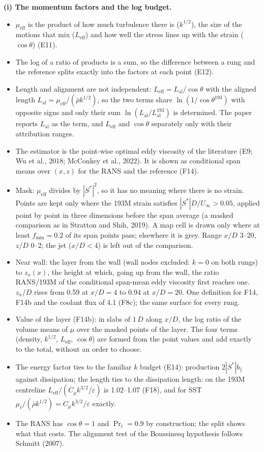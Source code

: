 \documentclass[10pt]{article}
\begin{document}
\textbf{(i) The momentum factors and the log budget.}
\begin{itemize}
\item $\mu_{\mathrm{eff}}$ is the product of how much turbulence there is ($k^{1/2}$), the size of the motions
  that mix ($L_{\mathrm{eff}}$) and how well the stress lines up with the strain ($\cos\theta$) (E11).
\item The log of a ratio of products is a sum, so the difference between a rung and the reference splits
  exactly into the factors at each point (E12).
\item Length and alignment are not independent: $L_{\mathrm{eff}}=L_{\mathrm{al}}/\cos\theta$ with the aligned length
  $L_{\mathrm{al}}=\mu_{\mathrm{eff}}/(\bar\rho k^{1/2})$, so the two terms share $\ln(1/\cos\theta^{193})$ with opposite
  signs and only their sum $\ln(L_{\mathrm{al}}/L_{\mathrm{al}}^{193})$ is determined. The paper reports $L_{\mathrm{al}}$
  as the term, and $L_{\mathrm{eff}}$ and $\cos\theta$ separately only with their attribution ranges.
\item The estimator is the point-wise optimal eddy viscosity of the literature (E9; Wu et al., 2018; McConkey et
  al., 2022). It is shown as conditional span means over $(x,z)$ for the RANS and the reference (F14).
\item Mask: $\mu_{\mathrm{eff}}$ divides by $|S^*|^2$, so it has no meaning where there is no strain. Points are
  kept only where the 193M strain satisfies $|S^*|D/U_\infty>0.05$, applied point by point in three dimensions
  before the span average (a masked comparison as in Stratton and Shih, 2019). A map cell is drawn only where at
  least $f_{\min}=0.2$ of its span points pass; elsewhere it is grey. Range $x/D$ 3--20, $z/D$ 0--2; the jet
  ($x/D<4$) is left out of the comparison.
\item Near wall: the layer from the wall (wall nodes excluded: $k=0$ on both rungs) to $z_x(x)$, the height at
  which, going up from the wall, the ratio RANS/193M of the conditional span-mean eddy viscosity first reaches
  one. $z_x/D$ rises from 0.59 at $x/D=4$ to 0.94 at $x/D=20$. One definition for F14, F14b and the coolant flux
  of 4.1 (F8c); the same surface for every rung.
\item Value of the layer (F14b): in slabs of $1\,D$ along $x/D$, the log ratio of the volume means of $\mu$ over the
  masked points of the layer. The four terms (density, $k^{1/2}$, $L_{\mathrm{eff}}$, $\cos\theta$) are formed
  from the point values and add exactly to the total, without an order to choose.
\item The energy factor ties to the familiar $k$ budget (E14): production $2|S^*|b_\parallel$ against
  dissipation; the length ties to the dissipation length: on the 193M centreline $L_{\mathrm{eff}}/(C_\mu
  k^{3/2}/\varepsilon)$ is 1.02--1.07 (F18), and for SST $\mu_t/(\bar\rho k^{1/2})=C_\mu k^{3/2}/\varepsilon$ exactly.
\item The RANS has $\cos\theta=1$ and $\Pr_t=0.9$ by construction; the split shows what that costs. The alignment
  test of the Boussinesq hypothesis follows Schmitt (2007).
\end{itemize}
\end{document}

